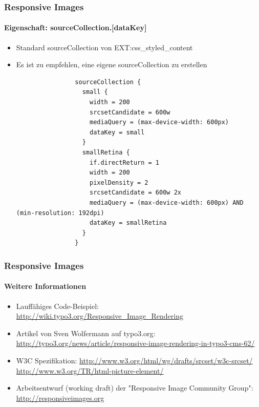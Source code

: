 
\begin{frame}[fragile]
	\frametitle{Responsive Images}
	\framesubtitle{Eigenschaft: sourceCollection.[dataKey]}

	\begin{itemize}
		\item Standard sourceCollection von EXT:css\_styled\_content
		\item Es ist zu empfehlen, eine eigene sourceCollection zu erstellen

			\lstset{
				basicstyle=\tiny\ttfamily
			}

			\begin{lstlisting}
				sourceCollection {
				  small {
				    width = 200
				    srcsetCandidate = 600w
				    mediaQuery = (max-device-width: 600px)
				    dataKey = small
				  }
				  smallRetina {
				    if.directReturn = 1
				    width = 200
				    pixelDensity = 2
				    srcsetCandidate = 600w 2x
				    mediaQuery = (max-device-width: 600px) AND (min-resolution: 192dpi)
				    dataKey = smallRetina
				  }
				}
			\end{lstlisting}
	\end{itemize}

\end{frame}


\begin{frame}[fragile]
	\frametitle{Responsive Images}
	\framesubtitle{Weitere Informationen}

	\begin{itemize}
		\item Lauffähiges Code-Beispiel:\newline
			\small\url{http://wiki.typo3.org/Responsive_Image_Rendering}\normalsize

		\item Artikel von Sven Wolfermann auf typo3.org:\newline
			\small\url{http://typo3.org/news/article/responsive-image-rendering-in-typo3-cms-62/}\normalsize

		\item W3C Spezifikation:\newline
			\small\url{http://www.w3.org/html/wg/drafts/srcset/w3c-srcset/}\newline
			\small\url{http://www.w3.org/TR/html-picture-element/}

		\item Arbeitsentwurf (working draft) der "Responsive Image Community Group":\newline
			\small\url{http://responsiveimages.org}\normalsize

	\end{itemize}

\end{frame}


